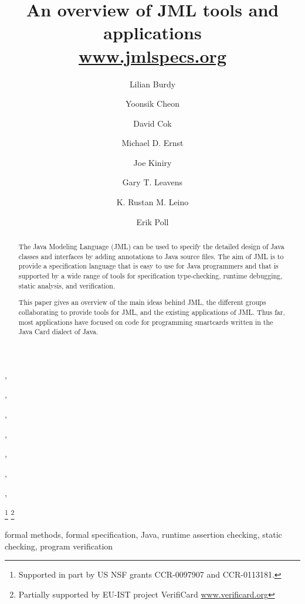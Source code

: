 \documentclass{entcs}
\begin{document}
\begin{frontmatter}
\title{
       \vspace*{-2ex}
       An overview of JML tools and applications\\
             \href{http://www.jmlspecs.org}{\large \url{www.jmlspecs.org}}
       \vspace*{-3ex}
       }
\author[Gemplus]{Lilian Burdy},
\author[Iastate]{Yoonsik Cheon},
\author[Kodak]{David Cok},
\author[MIT]{Michael D. Ernst},
\author[KUN]{Joe Kiniry},
\author[Iastate]{Gary T. Leavens},
\author[MSR]{K. Rustan M. Leino},
\author[KUN]{Erik Poll}
\address[Gemplus]{GEMPLUS Research Lab,
                  G\'emenos, France }
\address[Kodak]{Eastman Kodak Company,
                R\&D Laboratories,
                Rochester, New York, USA}
\address[Iastate]{Dept. of Computer Science,
                  Iowa State University,
                  Ames, Iowa, USA}
\address[MIT]{MIT Lab for Computer Science,
              Cambridge, Massachusetts, USA}
\address[KUN]{Dept. of Computer Science,
              University of Nijmegen,
              Nijmegen, the Netherlands}
\address[MSR]{Microsoft Research,
              Redmond, WA, USA
\vspace*{-2ex}
              }
\thanks[NSFISU]{Supported in part by US NSF grants CCR-0097907
 and CCR-0113181.}
\thanks[VerifiCard]{Partially supported by EU-IST project VerifiCard
                  \href{http://www.verificard.org}{\url{www.verificard.org}}}
\maketitle
\begin{abstract}
  The Java Modeling Language (JML) can be used to specify the detailed
  design of Java classes and interfaces by adding annotations to Java
  source files.  The aim of JML is to provide a specification language
  that is easy to use for Java programmers and that is supported by a
  wide range of tools for specification type-checking, runtime
  debugging, static analysis, and verification.
  
  This paper gives an overview of the main ideas behind JML, the
  different groups collaborating to provide tools for JML, and the
  existing applications of JML\@.  Thus far, most applications have
  focused on code for programming smartcards written in the Java Card
  dialect of Java.
\end{abstract}

\begin{keyword}
formal methods,
formal specification,
Java,
runtime assertion checking,
static checking,
program verification
\end{keyword}

\end{frontmatter}
\end{document}
